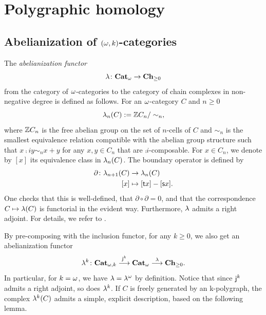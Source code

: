 \section{Polygraphic homology}\label{sec:polhom}
\subsection{Abelianization of \texorpdfstring{$(\omega,k)$}{(ω,k)}-categories}\label{subsec:abel}
\begin{paragr}
  The {\em abelianization functor}
  \[\mathsf{\lambda}\colon\mathbf{Cat}_{\omega} \to \mathbf{Ch}_{\geq 0} \]
  from the category of $\omega$\nbd-categories to
  the category of chain complexes in non-negative degree is defined as follows. For an $\omega$\nbd-category $C$ and $n\geq 0$
  \[
    \mathsf{\lambda}_n(C):=\mathbb Z C_n/\sim_n,
  \]
  where $\mathbb Z C_n$ is the free abelian group on the set of $n$\nbd-cells
  of $C$ and $\sim_n$ is the smallest equivalence relation compatible with
  the abelian group structure such that $x\comp{i} y
  \sim _n x + y$ for any $x,y\in C_n$ that are
  $\comp{i}$-composable. For $x\in C_n$, we denote by $[x]$ its
  equivalence class in $\mathsf{\lambda}_n(C)$. The boundary operator is defined by
  \[
    \begin{aligned}
      \partial \colon \mathsf{\lambda}_{n+1}(C) &\to \mathsf{\lambda}_{n}(C)\\
      [x] &\mapsto [\mathsf{t} x] - [\mathsf{s} x].
    \end{aligned}
  \]
  One checks that this is well-defined, that $\partial
  \circ \partial=0$, and that the correspondence $C \mapsto
  \mathsf{\lambda}(C)$ is functorial in the evident
  way. Furthermore, $\mathsf{\lambda}$ admits a right adjoint. For
  details, we refer to \cite[22.1]{abgmmm:polybk}.

  By pre-composing with the inclusion functor, for any $k\geq 0$, we
  also get an abelianization functor
  \[
    \mathsf{\mathsf{\lambda}}^{k} \colon \mathbf{Cat}_{\omega,k} \overset{\mathsf{j}_{}^{k}}{\longrightarrow} \mathbf{Cat}_{\omega} \overset{\mathsf{\lambda}}{\longrightarrow} \mathbf{Ch}_{\geq 0}.
  \]
  In particular, for $k=\omega$, we have $\mathsf{\lambda}=\mathsf{\mathsf{\lambda}}^{\omega}$ by
  definition. Notice that since $\mathsf{j}_{}^{k}$ admits a right adjoint, so
  does $\mathsf{\mathsf{\lambda}}^{k}$.
  If $C$ is freely generated by an \ook k-polygraph, the complex
  $\mathsf{\mathsf{\lambda}}^{k}(C)$ admits a simple, explicit description, based on the following
lemma.
\end{paragr}


